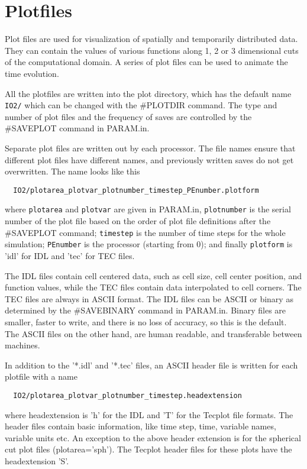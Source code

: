 \section{Plotfiles \label{section:plotfiles}}

Plot files are used for visualization of spatially and temporarily 
distributed data. They can contain the values of various functions 
along 1, 2 or 3 dimensional cuts of the computational domain. 
A series of plot files can be used to animate the time evolution.

All the plotfiles are written into the plot directory, which has
the default name {\tt IO2/} which can be changed with the \#PLOTDIR command.
The type and number of plot files and the frequency of saves  
are controlled by the \#SAVEPLOT command in PARAM.in.

Separate plot files are written out by each processor. The file names
ensure that different plot files have different names, and previously
written saves do not get overwritten. The name looks like this
\begin{verbatim}
  IO2/plotarea_plotvar_plotnumber_timestep_PEnumber.plotform
\end{verbatim}
where {\tt plotarea} and {\tt plotvar} are given in PARAM.in,
{\tt plotnumber} is the serial number of the plot file based
on the order of plot file definitions after the \#SAVEPLOT command;
{\tt timestep} is the number of time steps for the whole simulation;
{\tt PEnumber} is the processor (starting from 0); and finally
{\tt plotform} is 'idl' for IDL and 'tec' for TEC files.

The IDL files contain cell centered data, such as cell size, cell center
position, and function values, while the TEC files contain
data interpolated to cell corners. The TEC files are always in ASCII
format.
The IDL files can be ASCII or binary as determined by the \#SAVEBINARY
command in PARAM.in. Binary files are smaller, faster to write, 
and there is no loss of accuracy, so this is the default. The ASCII files
on the other hand, are human readable, and transferable between machines.

In addition to the '*.idl' and '*.tec' files, an ASCII header file is written
for each plotfile with a name
\begin{verbatim}
  IO2/plotarea_plotvar_plotnumber_timestep.headextension
\end{verbatim}
where headextension is 'h' for the IDL and 'T' for the Tecplot file formats.
The header files contain basic information, like time step, time,
variable names, variable units etc. An exception to the above header 
extension is for the spherical cut plot files (plotarea='sph').  
The Tecplot header files for these plots have the headextension 'S'.

